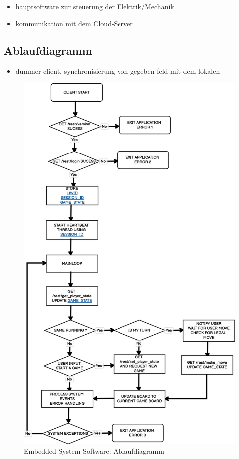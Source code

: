 \begin{itemize}
\tightlist
\item
  hauptsoftware zur steuerung der Elektrik/Mechanik
\item
  kommunikation mit dem Cloud-Server
\end{itemize}

\hypertarget{ablaufdiagramm}{%
\subsection{Ablaufdiagramm}\label{ablaufdiagramm}}

\begin{itemize}
\tightlist
\item
  dummer client, synchronisierung von gegeben feld mit dem lokalen
\end{itemize}

\begin{figure}
\centering
\includegraphics{images/ATC_gameclient_statemachiene.png}
\caption{Embedded System Software: Ablaufdiagramm}
\end{figure}

